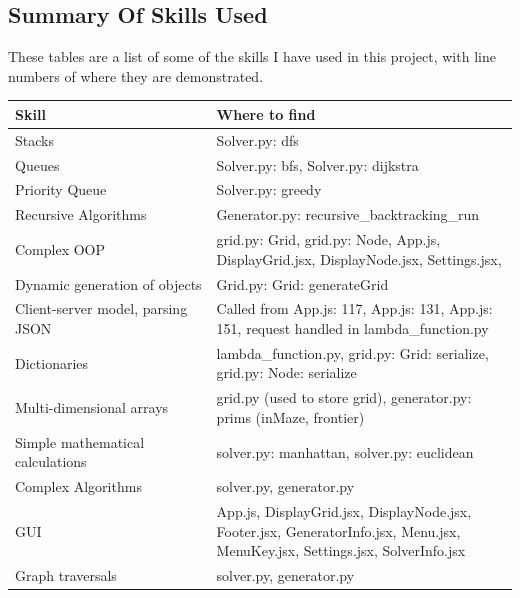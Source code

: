 \documentclass{article}
\begin{document}
\subsection{Summary Of Skills Used}
These tables are a list of some of the skills I have used in this project, with line numbers of where they are demonstrated.
\begin{center}
    
    \begin{tabular}{ |p{0.4\linewidth}|p{0.8\linewidth}| }
        \hline
        Skill & Where to find \\
        \hline
        \hline
        Stacks & Solver.py: dfs \\
        \hline
        Queues & Solver.py: bfs, Solver.py: dijkstra\\
        \hline
        Priority Queue & Solver.py: greedy \\
        \hline
        Recursive Algorithms & Generator.py: recursive\_backtracking\_run \\
        \hline
        Complex OOP & grid.py: Grid, grid.py: Node, App.js, DisplayGrid.jsx, DisplayNode.jsx, Settings.jsx,  \\
        \hline
        Dynamic generation of objects & Grid.py: Grid: generateGrid \\
        \hline
        Client-server model, parsing JSON & Called from App.js: 117, App.js: 131, App.js: 151, request handled in lambda\_function.py \\
        \hline
        Dictionaries & lambda\_function.py, grid.py: Grid: serialize, grid.py: Node: serialize \\
        \hline
        Multi-dimensional arrays & grid.py (used to store grid), generator.py: prims (inMaze, frontier) \\
        \hline 
        Simple mathematical calculations & solver.py: manhattan, solver.py: euclidean \\
        \hline
        Complex Algorithms & solver.py, generator.py \\
        \hline
        GUI & App.js, DisplayGrid.jsx, DisplayNode.jsx, Footer.jsx, GeneratorInfo.jsx, Menu.jsx, MenuKey.jsx, Settings.jsx, SolverInfo.jsx \\
        \hline
        Graph traversals & solver.py, generator.py \\
        \hline
    \end{tabular}

\end{center}
\end{document}
